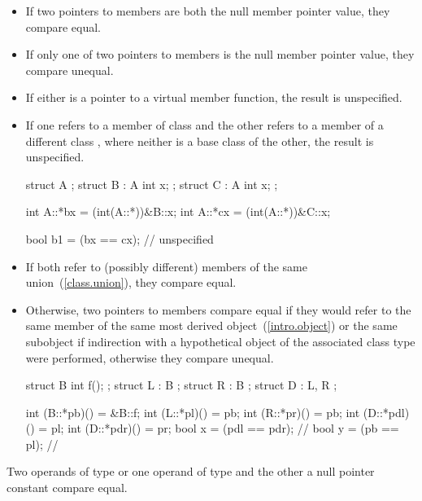 \begin{itemize}
\item
If two pointers to members are both the null member pointer value, they compare
equal.

\item
If only one of two pointers to members is the null member pointer value, they
compare unequal.

\item
If either is a pointer to a virtual member function, the result is unspecified.

\item
If one refers to a member of class  and the other refers to a member
of a different class , where neither is a base class of the other,
the result is unspecified.
\begin{example}
\begin{codeblock}
struct A {};
struct B : A { int x; };
struct C : A { int x; };

int A::*bx = (int(A::*))&B::x;
int A::*cx = (int(A::*))&C::x;

bool b1 = (bx == cx);   // unspecified
\end{codeblock}
\end{example}

\item
If both refer to (possibly different) members of the same union~(\ref{class.union}),
they compare equal.

\item
Otherwise, two pointers to members compare equal if they would refer to the same member of
the same most derived object~(\ref{intro.object}) or the same subobject if
indirection with a hypothetical object of the associated
class type were performed, otherwise they compare unequal.
\begin{example}

\begin{codeblock}
struct B {
  int f();
};
struct L : B { };
struct R : B { };
struct D : L, R { };

int (B::*pb)() = &B::f;
int (L::*pl)() = pb;
int (R::*pr)() = pb;
int (D::*pdl)() = pl;
int (D::*pdr)() = pr;
bool x = (pdl == pdr);          // 
bool y = (pb == pl);            // 
\end{codeblock}
\end{example}
\end{itemize}

\pnum
Two operands of type  or one operand of type
 and the other a null pointer constant compare equal.

